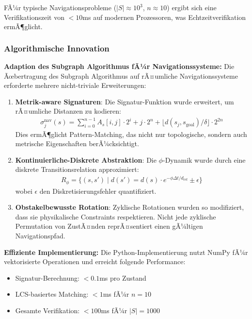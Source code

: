 ﻿\documentclass[a4paper,12pt]{article}
\theoremstyle{definition}
\begin{document}
FÃ¼r typische Navigationsprobleme ($|S| \approx 10^3$, $n \approx 10$) ergibt sich eine Verifikationszeit von $< 10$ms auf modernen Prozessoren, was Echtzeitverifikation ermÃ¶glicht.

\subsubsection{Algorithmische Innovation}

\textbf{Adaption des Subgraph Algorithmus fÃ¼r Navigationssysteme:}
Die Ãœbertragung des Subgraph Algorithmus auf rÃ¤umliche Navigationssysteme erforderte mehrere nicht-triviale Erweiterungen:

\begin{enumerate}
	\item \textbf{Metrik-aware Signaturen}: Die Signatur-Funktion wurde erweitert, um rÃ¤umliche Distanzen zu kodieren:
	\begin{align}
		\sigma_j^{\text{nav}}(s) = \sum_{i=0}^{n-1} A_s[i,j] \cdot 2^i + j \cdot 2^n + \lfloor d(s_j, s_{\text{goal}}) / \delta \rfloor \cdot 2^{2n}
	\end{align}
	Dies ermÃ¶glicht Pattern-Matching, das nicht nur topologische, sondern auch metrische Eigenschaften berÃ¼cksichtigt.
	
	\item \textbf{Kontinuierliche-Diskrete Abstraktion}: Die $\phi$-Dynamik wurde durch eine diskrete Transitionsrelation approximiert:
	\begin{align}
		R_{\phi} = \{(s, s') \mid d(s') = d(s) \cdot e^{-\phi \Delta t / d_{\text{ref}}} \pm \epsilon\}
	\end{align}
	wobei $\epsilon$ den Diskretisierungsfehler quantifiziert.
	
	\item \textbf{Obstakelbewusste Rotation}: Zyklische Rotationen wurden so modifiziert, dass sie physikalische Constraints respektieren. Nicht jede zyklische Permutation von ZustÃ¤nden reprÃ¤sentiert einen gÃ¼ltigen Navigationspfad.
\end{enumerate}

\textbf{Effiziente Implementierung:}
Die Python-Implementierung nutzt NumPy fÃ¼r vektorisierte Operationen und erreicht folgende Performance:

\begin{itemize}
	\item Signatur-Berechnung: $< 0.1$ms pro Zustand
	\item LCS-basiertes Matching: $< 1$ms fÃ¼r $n = 10$
	\item Gesamte Verifikation: $< 100$ms fÃ¼r $|S| = 1000$
\end{itemize}
\end{document}
